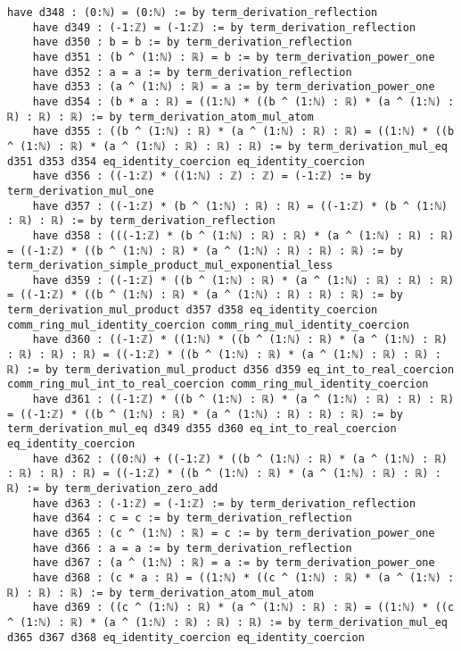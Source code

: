 \documentclass{article}
\begin{document}
\begin{tcolorbox}[colback=white!10, width=\linewidth]
\begin{lstlisting}[language=Lean4]
    have d348 : (0:ℕ) = (0:ℕ) := by term_derivation_reflection
    have d349 : (-1:ℤ) = (-1:ℤ) := by term_derivation_reflection
    have d350 : b = b := by term_derivation_reflection
    have d351 : (b ^ (1:ℕ) : ℝ) = b := by term_derivation_power_one
    have d352 : a = a := by term_derivation_reflection
    have d353 : (a ^ (1:ℕ) : ℝ) = a := by term_derivation_power_one
    have d354 : (b * a : ℝ) = ((1:ℕ) * ((b ^ (1:ℕ) : ℝ) * (a ^ (1:ℕ) : ℝ) : ℝ) : ℝ) := by term_derivation_atom_mul_atom
    have d355 : ((b ^ (1:ℕ) : ℝ) * (a ^ (1:ℕ) : ℝ) : ℝ) = ((1:ℕ) * ((b ^ (1:ℕ) : ℝ) * (a ^ (1:ℕ) : ℝ) : ℝ) : ℝ) := by term_derivation_mul_eq d351 d353 d354 eq_identity_coercion eq_identity_coercion
    have d356 : ((-1:ℤ) * ((1:ℕ) : ℤ) : ℤ) = (-1:ℤ) := by term_derivation_mul_one
    have d357 : ((-1:ℤ) * (b ^ (1:ℕ) : ℝ) : ℝ) = ((-1:ℤ) * (b ^ (1:ℕ) : ℝ) : ℝ) := by term_derivation_reflection
    have d358 : (((-1:ℤ) * (b ^ (1:ℕ) : ℝ) : ℝ) * (a ^ (1:ℕ) : ℝ) : ℝ) = ((-1:ℤ) * ((b ^ (1:ℕ) : ℝ) * (a ^ (1:ℕ) : ℝ) : ℝ) : ℝ) := by term_derivation_simple_product_mul_exponential_less
    have d359 : ((-1:ℤ) * ((b ^ (1:ℕ) : ℝ) * (a ^ (1:ℕ) : ℝ) : ℝ) : ℝ) = ((-1:ℤ) * ((b ^ (1:ℕ) : ℝ) * (a ^ (1:ℕ) : ℝ) : ℝ) : ℝ) := by term_derivation_mul_product d357 d358 eq_identity_coercion comm_ring_mul_identity_coercion comm_ring_mul_identity_coercion
    have d360 : ((-1:ℤ) * ((1:ℕ) * ((b ^ (1:ℕ) : ℝ) * (a ^ (1:ℕ) : ℝ) : ℝ) : ℝ) : ℝ) = ((-1:ℤ) * ((b ^ (1:ℕ) : ℝ) * (a ^ (1:ℕ) : ℝ) : ℝ) : ℝ) := by term_derivation_mul_product d356 d359 eq_int_to_real_coercion comm_ring_mul_int_to_real_coercion comm_ring_mul_identity_coercion
    have d361 : ((-1:ℤ) * ((b ^ (1:ℕ) : ℝ) * (a ^ (1:ℕ) : ℝ) : ℝ) : ℝ) = ((-1:ℤ) * ((b ^ (1:ℕ) : ℝ) * (a ^ (1:ℕ) : ℝ) : ℝ) : ℝ) := by term_derivation_mul_eq d349 d355 d360 eq_int_to_real_coercion eq_identity_coercion
    have d362 : ((0:ℕ) + ((-1:ℤ) * ((b ^ (1:ℕ) : ℝ) * (a ^ (1:ℕ) : ℝ) : ℝ) : ℝ) : ℝ) = ((-1:ℤ) * ((b ^ (1:ℕ) : ℝ) * (a ^ (1:ℕ) : ℝ) : ℝ) : ℝ) := by term_derivation_zero_add
    have d363 : (-1:ℤ) = (-1:ℤ) := by term_derivation_reflection
    have d364 : c = c := by term_derivation_reflection
    have d365 : (c ^ (1:ℕ) : ℝ) = c := by term_derivation_power_one
    have d366 : a = a := by term_derivation_reflection
    have d367 : (a ^ (1:ℕ) : ℝ) = a := by term_derivation_power_one
    have d368 : (c * a : ℝ) = ((1:ℕ) * ((c ^ (1:ℕ) : ℝ) * (a ^ (1:ℕ) : ℝ) : ℝ) : ℝ) := by term_derivation_atom_mul_atom
    have d369 : ((c ^ (1:ℕ) : ℝ) * (a ^ (1:ℕ) : ℝ) : ℝ) = ((1:ℕ) * ((c ^ (1:ℕ) : ℝ) * (a ^ (1:ℕ) : ℝ) : ℝ) : ℝ) := by term_derivation_mul_eq d365 d367 d368 eq_identity_coercion eq_identity_coercion

\end{lstlisting}
\end{tcolorbox}
\end{document}
